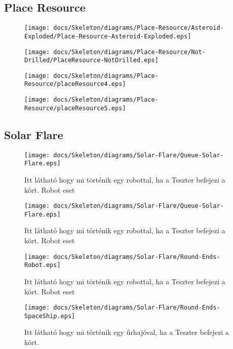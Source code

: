 \subsection{Place Resource}

\begin{figure}[H] 
    \centering 
    \texttt{[image: docs/Skeleton/diagrams/Place-Resource/Asteroid-Exploded/Place-Resource-Asteroid-Exploded.eps]} 
    \caption{} 
\end{figure} 

\begin{figure}[H] 
    \centering 
    \texttt{[image: docs/Skeleton/diagrams/Place-Resource/Not-Drilled/PlaceResource-NotDrilled.eps]} 
    \caption{} 
\end{figure} 

\begin{figure}[H] 
    \centering 
    \texttt{[image: docs/Skeleton/diagrams/Place-Resource/placeResource4.eps]} 
    \caption{} 
\end{figure} 

\begin{figure}[H] 
    \centering 
    \texttt{[image: docs/Skeleton/diagrams/Place-Resource/placeResource5.eps]} 
    \caption{} 
\end{figure} 

\subsection{Solar Flare}

\begin{figure}[H] 
    \centering 
    \texttt{[image: docs/Skeleton/diagrams/Solar-Flare/Queue-Solar-Flare.eps]} 
    \caption{Itt látható hogy mi történik egy robottal, ha a Teszter befejezi a kört. Robot eset} 
\end{figure}

\begin{figure}[H] 
    \centering 
    \texttt{[image: docs/Skeleton/diagrams/Solar-Flare/Queue-Solar-Flare.eps]} 
    \caption{Itt látható hogy mi történik egy robottal, ha a Teszter befejezi a kört. Robot eset} 
\end{figure}

\begin{figure}[H] 
    \centering 
    \texttt{[image: docs/Skeleton/diagrams/Solar-Flare/Round-Ends-Robot.eps]} 
    \caption{Itt látható hogy mi történik egy robottal, ha a Teszter befejezi a kört. Robot eset} 
\end{figure}

\begin{figure}[H] 
    \centering 
    \texttt{[image: docs/Skeleton/diagrams/Solar-Flare/Round-Ends-SpaceShip.eps]} 
    \caption{Itt látható hogy mi történik egy űrhajóval, ha a Teszter befejezi a kört.} 
\end{figure}


